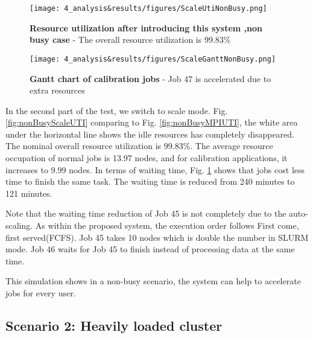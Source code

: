 \begin{figure}
    \centering
    \begin{minipage}{.48\textwidth}
      \centering
      \texttt{[image: 4\_analysis\&results/figures/ScaleUtiNonBusy.png]}
      \caption[Resource utilization after introducing this system ,non busy case]{{\small\textbf{Resource utilization after introducing this system ,non busy case} - The overall resource utilization is 99.83\%}}
      \label{fig:nonBusyScaleUTI}
    \end{minipage} 
    \begin{minipage}{.48\textwidth}
      \centering
      \texttt{[image: 4\_analysis\&results/figures/ScaleGanttNonBusy.png]}
      \caption[Gantt chart of calibration jobs]{{\small\textbf{Gantt chart of calibration jobs} - Job 47 is accelerated due to extra resources }}
      \label{fig:nonBusyScalegantt}
    \end{minipage}
\end{figure}
In the second part of the test, we switch to scale mode. Fig. \ref{fig:nonBusyScaleUTI} comparing to Fig. \ref{fig:nonBusyMPIUTI}, the white area under the horizontal line shows the idle resources has completely disappeared.
The nominal overall resource utilization is  99.83\%. The average resource occupation of normal jobs is 13.97 nodes, and for calibration applications, it increases to 9.99 nodes.
In terms of waiting time, Fig. \ref{fig:nonBusyScalegantt} shows that jobs cost less time to finish the same task.
The waiting time is reduced from 240 minutes to 121 minutes.

Note that the waiting time reduction of Job 45 is not completely due to the auto-scaling.
As within the proposed system, the execution order follows First come, first served(FCFS).
Job 45 takes 10 nodes which is double the number in SLURM mode. 
Job 46 waits for Job 45 to finish instead of processing data at the same time.  

This simulation shows in a non-busy scenario, the system can help to accelerate jobs for every user.

\subsection{Scenario 2: Heavily loaded cluster}

